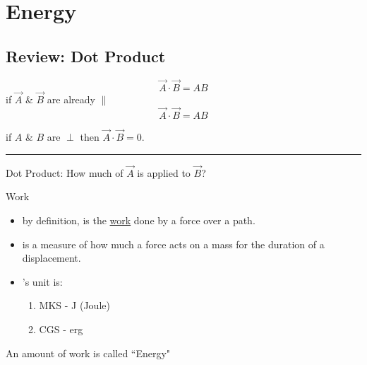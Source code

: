 \documentclass{article}
\begin{document}
\newcommand{\hr}{\par\noindent\rule{\textwidth}{0.4pt}}

\newcommand{\bc}[1]{
	\begin{equation*}
		\begin{boxed}
			{#1}
		\end{boxed}
	\end{equation*}
}

\newcommand{\cond}[2]{
	\ifmmode
		{#1} \quad {#2}
	\else
		$$ {#1} \quad {#2} $$
	\fi
}

\tableofcontents

\section{Energy}

\subsection{Review: Dot Product}

$$ \vec{A} \cdot \vec{B} = AB $$
if $ \vec{A} $ \& $ \vec{B} $ are already $ \parallel $
$$ \vec{A} \cdot \vec{B} = AB $$

if $ A $ \& $ B $ are $ \perp $ then $ \vec{A} \cdot \vec{B} = 0 $.

\hr

Dot Product: How much of $ \vec{A} $ is applied to $ \vec{B} $?

Work
\begin{itemize}
	\item by definition, is the \underline{work} done by a force over a path.
	\item is a measure of how much a force acts on a mass for the duration of a displacement.
	\item 's unit is:
		\begin{enumerate}
			\item MKS - J (Joule)
			\item CGS - erg
		\end{enumerate}
\end{itemize}
An amount of work is called ``Energy"
\end{document}

